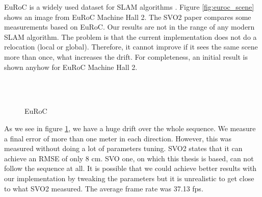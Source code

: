 \documentclass[11pt,a4paper,titlepage,oneside]{report}
\begin{document}
EuRoC is a widely used dataset for SLAM algorithms \cite{euroc}. Figure \ref{fig:euroc_scene} shows an image from EuRoC Machine Hall 2. The SVO2 paper \cite{svo2} compares some measurements based on EuRoC. Our results are not in the range of any modern SLAM algorithm. The problem is that the current implementation does not do a relocation (local or global). Therefore, it cannot improve if it sees the same scene more than once, what increases the drift. For completeness, an initial result is shown anyhow for EuRoC Machine Hall 2.

\begin{figure}[H]
  \\
  \\
  \caption{EuRoC }\label{fig:euroc}
\end{figure}

As we see in figure \ref{fig:euroc}, we have a huge drift over the whole sequence. We measure a final error of more than one meter in each direction. However, this was measured without doing a lot of parameters tuning. SVO2 states that it can achieve an RMSE of only 8 cm. SVO one, on which this thesis is based, can not follow the sequence at all. It is possible that we could achieve better results with our implementation by tweaking the parameters but it is unrealistic to get close to what SVO2 measured. The average frame rate was 37.13 fps.
\end{document}
